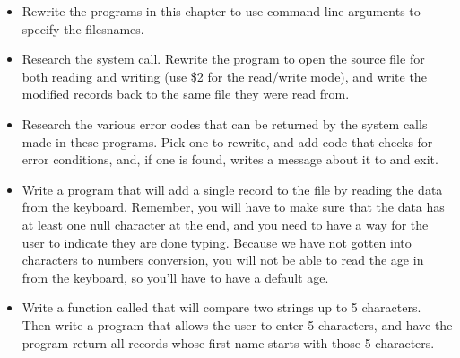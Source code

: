\begin{itemize}\item Rewrite the programs in this chapter to use command-line arguments to specify the filesnames. 
\item Research the  system call.  Rewrite the  program to open the source file for both reading and writing (use \$2 for the read/write mode), and write the modified records back to the same file they were read from. 
\item Research the various error codes that can be returned by the system calls made in these programs.  Pick one to rewrite, and add code that checks {\eaxRegIdx} for error conditions, and, if one is found, writes a message about it to  and exit. 
\item Write a program that will add a single record to the file by reading the data from the keyboard.  Remember, you will have to make sure that the data has at least one null character at the end, and you need to have a way for the user to indicate they are done typing.  Because we have not gotten into characters to numbers conversion, you will not be able to read the age in from the keyboard, so you'll have to have a default age. 
\item Write a function called  that will compare two strings up to 5 characters.  Then write a program that allows the user to enter 5 characters, and have the program return all records whose first name starts with those 5 characters. 
\end{itemize}

